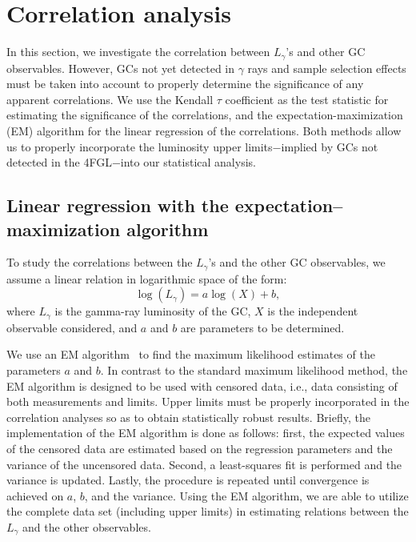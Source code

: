 \documentclass[doublespace,nopageskip]{VTthesis} %
\begin{document}
\section{Correlation analysis}\label{sec:correlation}

In this section, we investigate the correlation between $L_\gamma$'s and other GC observables. However, GCs not yet detected in $\gamma$ rays and sample selection effects must be taken into account to properly determine the significance of any apparent correlations. We use the Kendall $\tau$ coefficient as the test statistic for estimating the significance of the correlations, and the expectation-maximization (EM) algorithm for the linear regression of the correlations. Both methods allow us to properly incorporate the luminosity upper limits$-$implied by GCs not detected in the 4FGL$-$into our statistical analysis.

\subsection{Linear regression with the expectation–maximization algorithm}\label{sec:EM}

To study the correlations between the $L_\gamma$'s and the other GC observables, we assume a linear relation in logarithmic space of the form:
\begin{equation}
    \log(L_\gamma) = a\log(X)+b,
\end{equation}
where $L_\gamma$ is the gamma-ray luminosity of the GC, $X$ is the independent observable considered, and $a$ and $b$ are parameters to be determined. 

We use an EM algorithm~\citep{1985ApJ...293..192F,1986ApJ...306..490I,1992BAAS...24..839L} to find the maximum likelihood estimates of the parameters $a$ and $b$. In contrast to the standard maximum likelihood method, the EM algorithm is designed to be used with censored data, i.e., data consisting of both measurements and limits. Upper limits must be properly incorporated in the correlation analyses so as to obtain statistically robust results. Briefly, the implementation of the EM algorithm is done as follows: first, the expected values of the censored data are estimated based on the regression parameters and the variance of the uncensored data. Second, a least-squares fit is performed and the variance is updated. Lastly, the procedure is repeated until convergence is achieved on $a$, $b$, and the variance. Using the EM algorithm, we are able to utilize the complete data set (including upper limits) in estimating relations between the $L_\gamma$ and the other observables.
\end{document}
